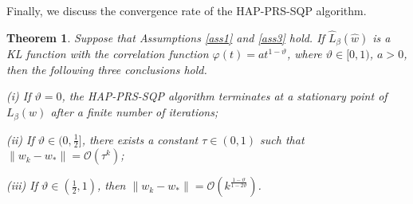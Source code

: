 \documentclass[pdflatex,sn-mathphys-num]{sn-jnl}%
\theoremstyle{thmstyleone}%
\newtheorem{theorem}{Theorem}%
\theoremstyle{thmstyletwo}%
\theoremstyle{thmstylethree}%
\begin{document}
Finally, we discuss the convergence rate of the HAP-PRS-SQP algorithm.
\begin{theorem}\label{the3}
Suppose that Assumptions \ref{ass1} and \ref{ass3} hold. If $\hat{L}_{\beta}(\hat{w})$ is a KL function with the correlation function $\varphi(t)=at^{1-\vartheta}$, where $\vartheta\in [0,1)$, $a>0$, then the following three conclusions hold.

(i) If $\vartheta=0$, the HAP-PRS-SQP algorithm terminates at a stationary point of $L_{\beta}(w)$  after a finite number of iterations;

(ii) If $\vartheta\in (0, \frac{1}{2}]$, there exists a constant $\tau \in (0,1)$ such that $\|w_k-w_*\|=\mathcal{O}(\tau ^{k})$;

(iii) If $\vartheta\in (\frac{1}{2},1)$, then $\|w_k-w_*\|=\mathcal{O}(k^{\frac{1-\vartheta}{1-2\vartheta}})$.
\end{theorem}
\end{document}
